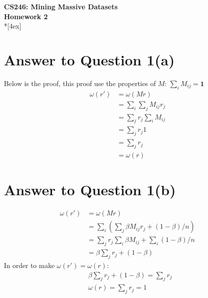 \documentclass[11pt]{article}
\begin{document}
\thispagestyle{empty}
\parindent 0pt
\vfill
\large

\begin{center}
\LARGE{\bf \textsf{CS246: Mining Massive Datasets}}\\ {\bf \textsf{Homework 2}}
\\*[4ex]
\end{center}

\section*{Answer to Question 1(a)}
Below is the proof, this proof use the properties of $M$: $\sum_iM_{ij}=\mathbf{1}$
\begin{equation*}
\begin{aligned}
    \omega(r') & = \omega(Mr)\\
    & = \sum_i\sum_jM_{ij}r_j\\
    & = \sum_jr_j\sum_iM_{ij}\\
    & = \sum_jr_j1\\
    & = \sum_jr_j\\
    & = \omega(r)
\end{aligned}
\end{equation*}

\pagebreak[4]
\section*{Answer to Question 1(b)}
\begin{equation*}
\begin{aligned}
    \omega(r') & = \omega(Mr)\\
    & = \sum_i(\sum_j\beta M_{ij}r_j+(1-\beta)/n)\\
    & = \sum_jr_j\sum_i\beta M_{ij}+\sum_i(1-\beta)/n\\
    & = \beta\sum_jr_j + (1-\beta)
\end{aligned}
\end{equation*}
In order to make $\omega(r') = \omega(r)$:
\begin{equation}
\begin{aligned}
    & \beta\sum_jr_j + (1-\beta) = \sum_jr_j\\
    & \omega(r) = \sum_jr_j = 1
\end{aligned}
\end{equation}

\pagebreak[4]
\end{document}
